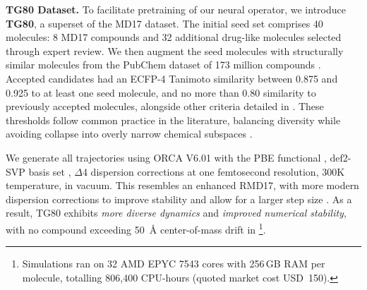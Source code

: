 \textbf{TG80 Dataset.}
To facilitate pretraining of our neural operator, we introduce \textbf{TG80}, a superset of the MD17 dataset. The initial seed set comprises 40 molecules: 8 MD17 compounds and 32 additional drug-like molecules selected through expert review. We then augment the seed molecules with structurally similar molecules from the PubChem dataset of 173 million compounds \cite{bolton_pubchem3d_2011}. 
%
Accepted candidates had an ECFP-4 Tanimoto similarity between 0.875 and 0.925 to at least one seed molecule, and no more than 0.80 similarity to previously accepted molecules, alongside other criteria detailed in  \cite{greg_landrum_rdkitrdkit_2025, rogers_extended-connectivity_2010, rogers_computer_1960}. These thresholds follow common practice in the literature, balancing diversity while avoiding collapse into overly narrow chemical subspaces \cite{matter_selecting_1997, menke_natural_2021, eastman_spice_2023, harper_research_2004, zhang_activity_2023}.

We generate all trajectories using ORCA V6.01 \cite{neese_software_2022} with the PBE functional \cite{perdew_generalized_1996}, def2-SVP basis set \cite{weigend_balanced_2005}, \(\Delta\)4 dispersion corrections \cite{caldeweyher_generally_2019, caldeweyher_extension_2020, wittmann_extension_2024} at one femtosecond resolution, 300K temperature, in vacuum. This resembles an enhanced RMD17, with more modern dispersion corrections to improve stability and allow for a larger step size \cite{christensen_role_2020}. As a result, TG80 exhibits \textit{more diverse dynamics} and \textit{improved numerical stability}, with no compound exceeding 50~\AA{} center-of-mass drift in \footnote{Simulations ran on 32 AMD EPYC 7543 cores with 256\,GB RAM per molecule, totalling 806{,}400 CPU-hours (quoted market cost USD~150).}.
\vspace{-0.3em}
